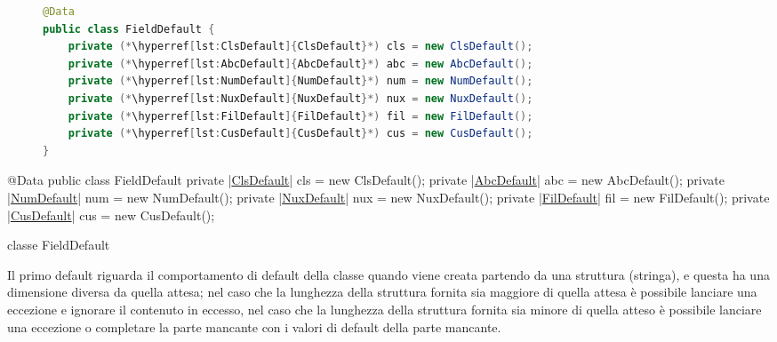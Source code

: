 \ifesource
\begin{figure*}[!htb]
\begin{lstlisting}[language=java, caption=classe FieldDefault, 
label=lst:FieldDefault]
@Data
public class FieldDefault {
    private (*\hyperref[lst:ClsDefault]{ClsDefault}*) cls = new ClsDefault();
    private (*\hyperref[lst:AbcDefault]{AbcDefault}*) abc = new AbcDefault();
    private (*\hyperref[lst:NumDefault]{NumDefault}*) num = new NumDefault();
    private (*\hyperref[lst:NuxDefault]{NuxDefault}*) nux = new NuxDefault();
    private (*\hyperref[lst:FilDefault]{FilDefault}*) fil = new FilDefault();
    private (*\hyperref[lst:CusDefault]{CusDefault}*) cus = new CusDefault();
}
\end{lstlisting}
\end{figure*}
\else
\begin{elisting}[!htb]
\begin{javacode}
@Data
public class FieldDefault {
    private |\hyperref[lst:ClsDefault]{ClsDefault}| cls = new ClsDefault();
    private |\hyperref[lst:AbcDefault]{AbcDefault}| abc = new AbcDefault();
    private |\hyperref[lst:NumDefault]{NumDefault}| num = new NumDefault();
    private |\hyperref[lst:NuxDefault]{NuxDefault}| nux = new NuxDefault();
    private |\hyperref[lst:FilDefault]{FilDefault}| fil = new FilDefault();
    private |\hyperref[lst:CusDefault]{CusDefault}| cus = new CusDefault();
}
\end{javacode}
\caption{classe FieldDefault}
\label{lst:FieldDefault}
\end{elisting}
\fi
Il primo default riguarda il comportamento di default della classe quando viene 
creata partendo da una struttura (stringa), e questa ha una dimensione diversa 
da quella attesa; nel caso che la lunghezza della struttura fornita sia maggiore 
di quella attesa è possibile lanciare una eccezione e ignorare il contenuto in 
eccesso, nel caso che la lunghezza della struttura fornita sia minore di quella 
atteso è possibile lanciare una eccezione o completare la parte mancante con i 
valori di default della parte mancante.

